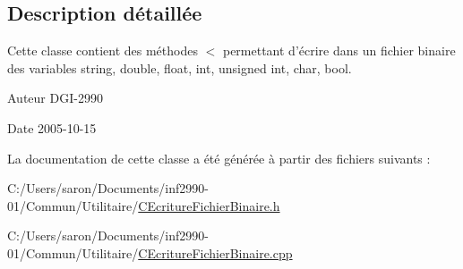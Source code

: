 \subsection{Description détaillée}
Cette classe contient des méthodes $<$ permettant d'écrire dans un fichier binaire des variables string, double, float, int, unsigned int, char, bool. 

\begin{DoxyAuthor}{Auteur}
D\-G\-I-\/2990 
\end{DoxyAuthor}
\begin{DoxyDate}{Date}
2005-\/10-\/15 
\end{DoxyDate}


La documentation de cette classe a été générée à partir des fichiers suivants \-:\begin{DoxyCompactItemize}
\item 
C\-:/\-Users/saron/\-Documents/inf2990-\/01/\-Commun/\-Utilitaire/\hyperlink{_c_ecriture_fichier_binaire_8h}{C\-Ecriture\-Fichier\-Binaire.\-h}\item 
C\-:/\-Users/saron/\-Documents/inf2990-\/01/\-Commun/\-Utilitaire/\hyperlink{_c_ecriture_fichier_binaire_8cpp}{C\-Ecriture\-Fichier\-Binaire.\-cpp}\end{DoxyCompactItemize}
